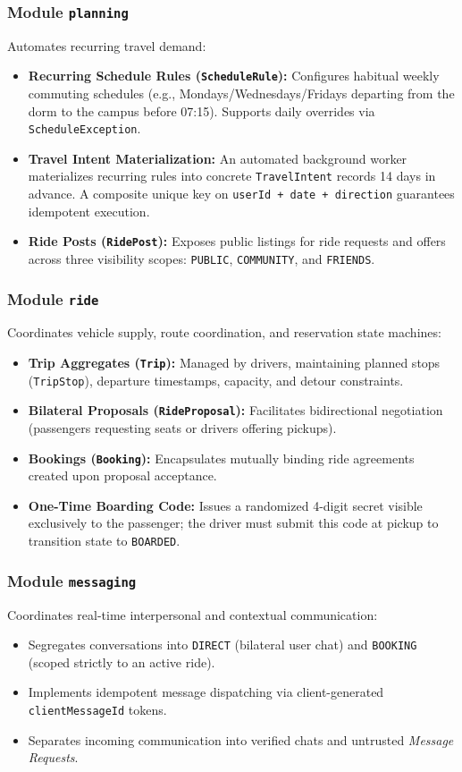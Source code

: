 \documentclass[conference,10pt,a4paper]{IEEEtran}
\begin{document}
\subsubsection{Module \texttt{planning}}
Automates recurring travel demand:
\begin{itemize}
    \item \textbf{Recurring Schedule Rules (\texttt{ScheduleRule}):} Configures habitual weekly commuting schedules (e.g., Mondays/Wednesdays/Fridays departing from the dorm to the campus before 07:15). Supports daily overrides via \texttt{ScheduleException}.
    \item \textbf{Travel Intent Materialization:} An automated background worker materializes recurring rules into concrete \texttt{TravelIntent} records 14 days in advance. A composite unique key on \texttt{userId + date + direction} guarantees idempotent execution.
    \item \textbf{Ride Posts (\texttt{RidePost}):} Exposes public listings for ride requests and offers across three visibility scopes: \texttt{PUBLIC}, \texttt{COMMUNITY}, and \texttt{FRIENDS}.
\end{itemize}

\subsubsection{Module \texttt{ride}}
Coordinates vehicle supply, route coordination, and reservation state machines:
\begin{itemize}
    \item \textbf{Trip Aggregates (\texttt{Trip}):} Managed by drivers, maintaining planned stops (\texttt{TripStop}), departure timestamps, capacity, and detour constraints.
    \item \textbf{Bilateral Proposals (\texttt{RideProposal}):} Facilitates bidirectional negotiation (passengers requesting seats or drivers offering pickups).
    \item \textbf{Bookings (\texttt{Booking}):} Encapsulates mutually binding ride agreements created upon proposal acceptance.
    \item \textbf{One-Time Boarding Code:} Issues a randomized 4-digit secret visible exclusively to the passenger; the driver must submit this code at pickup to transition state to \texttt{BOARDED}.
\end{itemize}

\subsubsection{Module \texttt{messaging}}
Coordinates real-time interpersonal and contextual communication:
\begin{itemize}
    \item Segregates conversations into \texttt{DIRECT} (bilateral user chat) and \texttt{BOOKING} (scoped strictly to an active ride).
    \item Implements idempotent message dispatching via client-generated \texttt{clientMessageId} tokens.
    \item Separates incoming communication into verified chats and untrusted \textit{Message Requests}.
\end{itemize}
\end{document}
